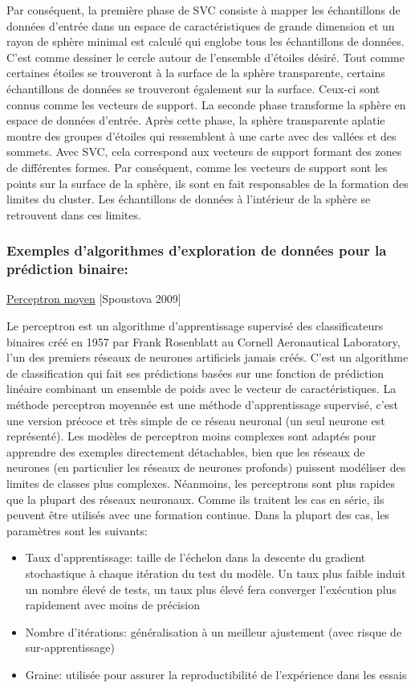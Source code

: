 \documentclass[12pt]{article}
\begin{document}
{Par conséquent, la première phase de SVC consiste à mapper les échantillons de données d'entrée dans un espace de caractéristiques de grande dimension et un rayon de sphère minimal est calculé qui englobe tous les échantillons de données. C'est comme dessiner le cercle autour de l'ensemble d'étoiles désiré. Tout comme certaines étoiles se trouveront à la surface de la sphère transparente, certains échantillons de données se trouveront également sur la surface. Ceux-ci sont connus comme les vecteurs de support. La seconde phase transforme la sphère en espace de données d'entrée. Après cette phase, la sphère transparente aplatie montre des groupes d'étoiles qui ressemblent à une carte avec des vallées et des sommets. Avec SVC, cela correspond aux vecteurs de support formant des zones de différentes formes. Par conséquent, comme les vecteurs de support sont les points sur la surface de la sphère, ils sont en fait responsables de la formation des limites du cluster. Les échantillons de données à l'intérieur de la sphère se retrouvent dans ces limites.

\subsubsection{Exemples d'algorithmes d'exploration de données pour la prédiction binaire:}

\underline{Perceptron moyen}  {\color{red}[Spoustova 2009]}

Le perceptron est un algorithme d'apprentissage supervisé des classificateurs binaires créé en 1957 par Frank Rosenblatt au Cornell Aeronautical Laboratory, l'un des premiers réseaux de neurones artificiels jamais créés. C'est un algorithme de classification qui fait ses prédictions basées sur une fonction de prédiction linéaire combinant un ensemble de poids avec le vecteur de caractéristiques.
La méthode perceptron moyennée est une méthode d'apprentissage supervisé, c'est une version précoce et très simple de ce réseau neuronal (un seul neurone est représenté).
Les modèles de perceptron moins complexes sont adaptés pour apprendre des exemples directement détachables, bien que les réseaux de neurones (en particulier les réseaux de neurones profonds) puissent modéliser des limites de classes plus complexes. Néanmoins, les perceptrons sont plus rapides que la plupart des réseaux neuronaux. Comme ils traitent les cas en série, ils peuvent être utilisés avec une formation continue.
Dans la plupart des cas, les paramètres sont les suivants:
\begin{itemize}
\item Taux d'apprentissage: taille de l'échelon dans la descente du gradient stochastique à chaque itération du test du modèle. Un taux plus faible induit un nombre élevé de tests, un taux plus élevé fera converger l'exécution plus rapidement avec moins de précision
\item Nombre d'itérations: généralisation à un meilleur ajustement (avec risque de sur-apprentissage)
\item Graine: utilisée pour assurer la reproductibilité de l'expérience dans les essais
\end{itemize}

}
\end{document}

